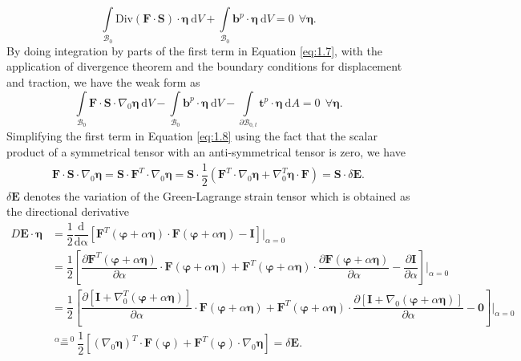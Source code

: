 \documentclass[11pt,a4paper,final]{article}
\begin{document}
\begin{equation}
\int\limits_{\mathcal{B}_0} \text{Div}(\mathbf{F} \cdot \mathbf{S}) \cdot \bm{\eta} \ \mathrm{d}V + \int\limits_{\mathcal{B}_0} \mathbf{b}^p \cdot \bm{\eta} \ \mathrm{d}V = 0 \ \ \forall \bm{\eta}.
\label{eq:1.7}
\end{equation}
By doing integration by parts of the first term in Equation \eqref{eq:1.7}, with the application of divergence theorem and the boundary conditions for displacement and traction, we have the weak form as 
\begin{equation}
\int\limits_{\mathcal{B}_0} \mathbf{F} \cdot \mathbf{S} \cdot \nabla_0 \bm{\eta} \ \mathrm{d}V - \int\limits_{\mathcal{B}_0} \mathbf{b}^p \cdot \bm{\eta} \ \mathrm{d}V - \int\limits_{\mathcal{\partial B}_{0,t}} \mathbf{t}^p \cdot \bm{\eta} \ \mathrm{d}A = 0 \ \ \forall \bm{\eta}.
\label{eq:1.8}
\end{equation}
Simplifying the first term in Equation \eqref{eq:1.8} using the fact that the scalar product of a symmetrical tensor with an anti-symmetrical tensor is zero, we have
\begin{align}
\mathbf{F} \cdot \mathbf{S} \cdot \nabla_0 \bm{\eta} = \mathbf{S} \cdot \mathbf{F}^T \cdot \nabla_0 \bm{\eta} = \mathbf{S} \cdot \dfrac{1}{2} (\mathbf{F}^T \cdot \nabla_0 \bm{\eta} + \nabla_0^T \bm{\eta} \cdot \mathbf{F}) = \mathbf{S} \cdot \delta \mathbf{E}.
\label{eq:1.9}
\end{align}
$\delta \mathbf{E}$ denotes the variation of the Green-Lagrange strain tensor which is obtained as the directional derivative
\begin{align}
D\mathbf{E} \cdot \bm{\eta} &= \dfrac{1}{2} \dfrac{\mathrm{d}}{\mathrm{d\alpha}} \left[ \mathbf{F}^T (\bm{\varphi} + \alpha \bm{\eta}) \cdot \mathbf{F}(\bm{\varphi} + \alpha \bm{\eta}) - \mathbf{I} \right] \Big|_{\alpha = 0} \nonumber \\
&= \dfrac{1}{2} \left[ \dfrac{\partial \mathbf{F}^T (\bm{\varphi} + \alpha \bm{\eta})}{\partial \alpha} \cdot \mathbf{F}(\bm{\varphi} + \alpha \bm{\eta}) + \mathbf{F}^T (\bm{\varphi} + \alpha \bm{\eta}) \cdot \dfrac{\partial \mathbf{F}(\bm{\varphi} + \alpha \bm{\eta})}{\partial \alpha} - \dfrac{\partial \mathbf{I}}{\partial \alpha} \right] \Bigg|_{\alpha = 0} \nonumber \\
&= \dfrac{1}{2} \left[ \dfrac{\partial \left[ \mathbf{I} + \nabla_0^T (\bm{\varphi} + \alpha \bm{\eta}) \right]}{\partial \alpha} \cdot \mathbf{F}(\bm{\varphi} + \alpha \bm{\eta}) + \mathbf{F}^T (\bm{\varphi} + \alpha \bm{\eta}) \cdot \dfrac{\partial \left[ \mathbf{I} + \nabla_0 (\bm{\varphi} + \alpha \bm{\eta}) \right]}{\partial \alpha} - \mathbf{0} \right] \Bigg|_{\alpha = 0} \nonumber \\
&\stackrel{\alpha = 0}{=} \dfrac{1}{2} \left[ (\nabla_0 \bm{\eta})^T \cdot \mathbf{F} (\bm{\varphi}) + \mathbf{F}^T (\bm{\varphi}) \cdot \nabla_0 \bm{\eta} \right] = \delta \mathbf{E}.
\label{eq:1.10}
\end{align}
\end{document}

